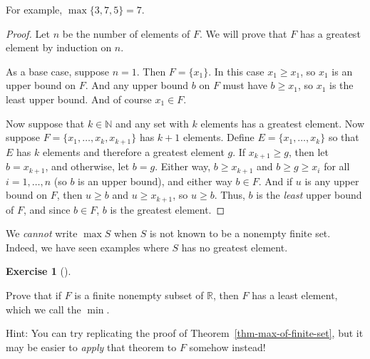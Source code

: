 \documentclass[
  letterpaper,
  DIV=11,
  numbers=noendperiod]{scrreprt}
\def\R{\mathbb R}
\def\N{\mathbb N}
\theoremstyle{plain}
\theoremstyle{definition}
\newtheorem{exercise}{Exercise}[chapter]
\theoremstyle{plain}
\theoremstyle{plain}
\theoremstyle{definition}
\theoremstyle{definition}
\theoremstyle{remark}
\begin{document}
For example, \(\max\{3,7,5\}=7\).

\begin{proof}
Let \(n\) be the number of elements of \(F\). We will prove that \(F\)
has a greatest element by induction on \(n\).

As a base case, suppose \(n=1\). Then \(F=\{x_1\}\). In this case
\(x_1\geq x_1\), so \(x_1\) is an upper bound on \(F\). And any upper
bound \(b\) on \(F\) must have \(b\geq x_1\), so \(x_1\) is the least
upper bound. And of course \(x_1\in F\).

Now suppose that \(k\in\N\) and any set with \(k\) elements has a
greatest element. Now suppose \(F=\{x_1,\ldots,x_k,x_{k+1}\}\) has
\(k+1\) elements. Define \(E=\{x_1,\ldots,x_k\}\) so that \(E\) has
\(k\) elements and therefore a greatest element \(g\). If
\(x_{k+1}\geq g\), then let \(b=x_{k+1}\), and otherwise, let \(b=g\).
Either way, \(b\geq x_{k+1}\) and \(b\geq g\geq x_i\) for all
\(i=1,\ldots,n\) (so \(b\) is an upper bound), and either way
\(b\in F\). And if \(u\) is any upper bound on \(F\), then \(u\geq b\)
and \(u\geq x_{k+1}\), so \(u\geq b\). Thus, \(b\) is the \emph{least}
upper bound of \(F\), and since \(b\in F\), \(b\) is the greatest
element.
\end{proof}

\begin{tcolorbox}[enhanced jigsaw, titlerule=0mm, opacitybacktitle=0.6, leftrule=.75mm, bottomrule=.15mm, left=2mm, arc=.35mm, colback=white, rightrule=.15mm, colframe=quarto-callout-caution-color-frame, toptitle=1mm, breakable, opacityback=0, colbacktitle=quarto-callout-caution-color!10!white, bottomtitle=1mm, title=\textcolor{quarto-callout-caution-color}{\faFire}\hspace{0.5em}{Caution}, coltitle=black, toprule=.15mm]

We \emph{cannot} write \(\max S\) when \(S\) is not known to be a
nonempty finite set. Indeed, we have seen examples where \(S\) has no
greatest element.

\end{tcolorbox}

\begin{exercise}[]\protect\hypertarget{exr-min}{}\label{exr-min}

Prove that if \(F\) is a finite nonempty subset of \(\R\), then \(F\)
has a least element, which we call the \(\min\).

Hint: You can try replicating the proof of
Theorem~\ref{thm-max-of-finite-set}, but it may be easier to
\emph{apply} that theorem to \(F\) somehow instead!

\end{exercise}
\end{document}
